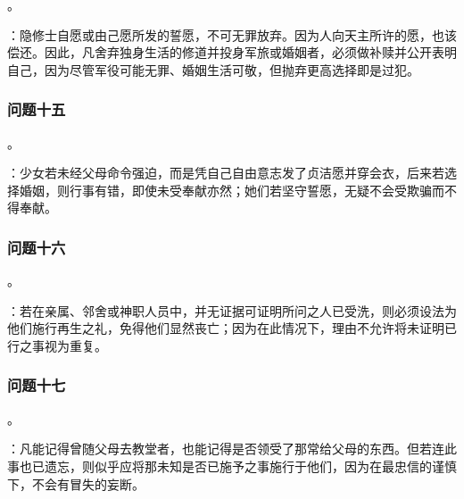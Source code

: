 。\par

：隐修士自愿或由己愿所发的誓愿，不可无罪放弃。因为人向天主所许的愿，也该偿还。因此，凡舍弃独身生活的修道并投身军旅或婚姻者，必须做补赎并公开表明自己，因为尽管军役可能无罪、婚姻生活可敬，但抛弃更高选择即是过犯。\par


\subsubsection{问题十五}

。\par

：少女若未经父母命令强迫，而是凭自己自由意志发了贞洁愿并穿会衣，后来若选择婚姻，则行事有错，即使未受奉献亦然；她们若坚守誓愿，无疑不会受欺骗而不得奉献。\par


\subsubsection{问题十六}

。\par

：若在亲属、邻舍或神职人员中，并无证据可证明所问之人已受洗，则必须设法为他们施行再生之礼，免得他们显然丧亡；因为在此情况下，理由不允许将未证明已行之事视为重复。\par


\subsubsection{问题十七}

。\par

：凡能记得曾随父母去教堂者，也能记得是否领受了那常给父母的东西。但若连此事也已遗忘，则似乎应将那未知是否已施予之事施行于他们，因为在最忠信的谨慎下，不会有冒失的妄断。\par

